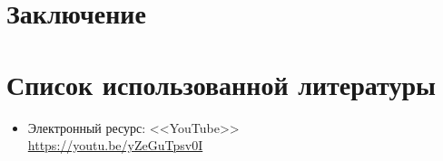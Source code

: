 \documentclass[a4paper, 12pt]{article}
\begin{document}
\newpage
\section*{Заключение}


\newpage

\section*{Список использованной
литературы}
\begin{itemize}
\item Электронный ресурс: <<YouTube>> \\
\url{https://youtu.be/yZeGuTpsv0I}
\end{itemize}

\end{document}
